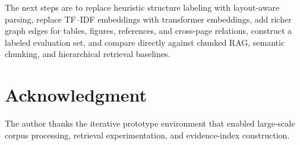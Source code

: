 \documentclass[conference]{IEEEtran}
\begin{document}
The next steps are to replace heuristic structure labeling with layout-aware parsing, replace TF--IDF embeddings with transformer embeddings, add richer graph edges for tables, figures, references, and cross-page relations, construct a labeled evaluation set, and compare directly against chunked RAG, semantic chunking, and hierarchical retrieval baselines.

\section*{Acknowledgment}
The author thanks the iterative prototype environment that enabled large-scale corpus processing, retrieval experimentation, and evidence-index construction.



\end{document}
